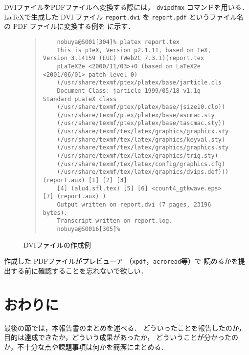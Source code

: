 \documentclass{jarticle}[11pt]
\newcommand{\figref}[1]{\makebox{図~\ref{#1}}}
\begin{document}
    DVIファイルをPDFファイルへ変換する際には，
    \verb|dvipdfmx| コマンドを用いる．
    \LaTeX で生成した DVI ファイル \verb|report.dvi| を
    \verb|report.pdf| というファイル名の PDF ファイルに変換する例を
    \figref{fig:DVIファイルの作成例}に示す．
    \begin{figure}[htb]
    {\small
    \begin{quote}
    \begin{verbatim}
    nobuya@S001[304]% platex report.tex
    This is pTeX, Version p2.1.11, based on TeX, Version 3.14159 (EUC) (Web2C 7.3.1)(report.tex
    pLaTeX2e <2000/11/03>+0 (based on LaTeX2e <2001/06/01> patch level 0)
    (/usr/share/texmf/ptex/platex/base/jarticle.cls
    Document Class: jarticle 1999/05/18 v1.1q Standard pLaTeX class
    (/usr/share/texmf/ptex/platex/base/jsize10.clo))
    (/usr/share/texmf/ptex/platex/base/ascmac.sty
    (/usr/share/texmf/ptex/platex/base/tascmac.sty))
    (/usr/share/texmf/tex/latex/graphics/graphicx.sty
    (/usr/share/texmf/tex/latex/graphics/keyval.sty)
    (/usr/share/texmf/tex/latex/graphics/graphics.sty
    (/usr/share/texmf/tex/latex/graphics/trig.sty)
    (/usr/share/texmf/tex/latex/config/graphics.cfg)
    (/usr/share/texmf/tex/latex/graphics/dvips.def))) (report.aux) [1] [2] [3]
    [4] (alu4.sfl.tex) [5] [6] <count4_gtkwave.eps> [7] (report.aux) )
    Output written on report.dvi (7 pages, 23196 bytes).
    Transcript written on report.log.
    nobuya@S0016[305]%
    \end{verbatim}
    \end{quote}
    } %
    \caption{DVIファイルの作成例}
    \label{fig:DVIファイルの作成例}
    \end{figure}
    作成した PDFファイルがプレビューア （\verb|xpdf|，\verb|acroread|等）で
    読めるかを提出する前に確認することを忘れないで欲しい．
     
     
    \section{おわりに}
    \label{sec:おわりに}
    最後の節では，本報告書のまとめを述べる．
    どういったことを報告したのか，目的は達成できたか，どういう成果があったか，
    どういうことが分かったのか，不十分な点や課題事項は何かを簡潔にまとめる．
     
\end{document}
